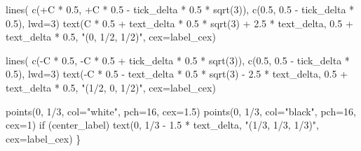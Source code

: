 \documentclass[
  letterpaper,
  DIV=11,
  numbers=noendperiod]{scrartcl}
\newenvironment{Shaded}{\begin{snugshade}}{\end{snugshade}}
\newcommand{\AttributeTok}[1]{\textcolor[rgb]{0.40,0.45,0.13}{#1}}
\newcommand{\ControlFlowTok}[1]{\textcolor[rgb]{0.00,0.23,0.31}{#1}}
\newcommand{\DecValTok}[1]{\textcolor[rgb]{0.68,0.00,0.00}{#1}}
\newcommand{\FloatTok}[1]{\textcolor[rgb]{0.68,0.00,0.00}{#1}}
\newcommand{\FunctionTok}[1]{\textcolor[rgb]{0.28,0.35,0.67}{#1}}
\newcommand{\NormalTok}[1]{\textcolor[rgb]{0.00,0.23,0.31}{#1}}
\newcommand{\SpecialCharTok}[1]{\textcolor[rgb]{0.37,0.37,0.37}{#1}}
\newcommand{\StringTok}[1]{\textcolor[rgb]{0.13,0.47,0.30}{#1}}
\begin{document}
\begin{Shaded}
\begin{Highlighting}[]
  \FunctionTok{lines}\NormalTok{( }\FunctionTok{c}\NormalTok{(}\SpecialCharTok{+}\NormalTok{C }\SpecialCharTok{*} \FloatTok{0.5}\NormalTok{, }\SpecialCharTok{+}\NormalTok{C }\SpecialCharTok{*} \FloatTok{0.5} \SpecialCharTok{{-}}\NormalTok{ tick\_delta }\SpecialCharTok{*} \FloatTok{0.5} \SpecialCharTok{*} \FunctionTok{sqrt}\NormalTok{(}\DecValTok{3}\NormalTok{)),}
         \FunctionTok{c}\NormalTok{(}\FloatTok{0.5}\NormalTok{, }\FloatTok{0.5} \SpecialCharTok{{-}}\NormalTok{ tick\_delta }\SpecialCharTok{*} \FloatTok{0.5}\NormalTok{), }\AttributeTok{lwd=}\DecValTok{3}\NormalTok{)}
  \FunctionTok{text}\NormalTok{(C }\SpecialCharTok{*} \FloatTok{0.5} \SpecialCharTok{+}\NormalTok{ text\_delta }\SpecialCharTok{*} \FloatTok{0.5} \SpecialCharTok{*} \FunctionTok{sqrt}\NormalTok{(}\DecValTok{3}\NormalTok{) }\SpecialCharTok{+} \FloatTok{2.5} \SpecialCharTok{*}\NormalTok{ text\_delta,}
       \FloatTok{0.5} \SpecialCharTok{+}\NormalTok{ text\_delta }\SpecialCharTok{*} \FloatTok{0.5}\NormalTok{, }\StringTok{"(0, 1/2, 1/2)"}\NormalTok{, }\AttributeTok{cex=}\NormalTok{label\_cex)}

  \FunctionTok{lines}\NormalTok{( }\FunctionTok{c}\NormalTok{(}\SpecialCharTok{{-}}\NormalTok{C }\SpecialCharTok{*} \FloatTok{0.5}\NormalTok{, }\SpecialCharTok{{-}}\NormalTok{C }\SpecialCharTok{*} \FloatTok{0.5} \SpecialCharTok{+}\NormalTok{ tick\_delta }\SpecialCharTok{*} \FloatTok{0.5} \SpecialCharTok{*} \FunctionTok{sqrt}\NormalTok{(}\DecValTok{3}\NormalTok{)),}
         \FunctionTok{c}\NormalTok{(}\FloatTok{0.5}\NormalTok{, }\FloatTok{0.5} \SpecialCharTok{{-}}\NormalTok{ tick\_delta }\SpecialCharTok{*} \FloatTok{0.5}\NormalTok{), }\AttributeTok{lwd=}\DecValTok{3}\NormalTok{)}
  \FunctionTok{text}\NormalTok{(}\SpecialCharTok{{-}}\NormalTok{C }\SpecialCharTok{*} \FloatTok{0.5} \SpecialCharTok{{-}}\NormalTok{ text\_delta }\SpecialCharTok{*} \FloatTok{0.5} \SpecialCharTok{*} \FunctionTok{sqrt}\NormalTok{(}\DecValTok{3}\NormalTok{) }\SpecialCharTok{{-}} \FloatTok{2.5} \SpecialCharTok{*}\NormalTok{ text\_delta,}
       \FloatTok{0.5} \SpecialCharTok{+}\NormalTok{ text\_delta }\SpecialCharTok{*} \FloatTok{0.5}\NormalTok{, }\StringTok{"(1/2, 0, 1/2)"}\NormalTok{, }\AttributeTok{cex=}\NormalTok{label\_cex)}

  \FunctionTok{points}\NormalTok{(}\DecValTok{0}\NormalTok{, }\DecValTok{1}\SpecialCharTok{/}\DecValTok{3}\NormalTok{, }\AttributeTok{col=}\StringTok{"white"}\NormalTok{, }\AttributeTok{pch=}\DecValTok{16}\NormalTok{, }\AttributeTok{cex=}\FloatTok{1.5}\NormalTok{)}
  \FunctionTok{points}\NormalTok{(}\DecValTok{0}\NormalTok{, }\DecValTok{1}\SpecialCharTok{/}\DecValTok{3}\NormalTok{, }\AttributeTok{col=}\StringTok{"black"}\NormalTok{, }\AttributeTok{pch=}\DecValTok{16}\NormalTok{, }\AttributeTok{cex=}\DecValTok{1}\NormalTok{)}
  \ControlFlowTok{if}\NormalTok{ (center\_label)}
    \FunctionTok{text}\NormalTok{(}\DecValTok{0}\NormalTok{, }\DecValTok{1}\SpecialCharTok{/}\DecValTok{3} \SpecialCharTok{{-}} \FloatTok{1.5} \SpecialCharTok{*}\NormalTok{ text\_delta, }\StringTok{"(1/3, 1/3, 1/3)"}\NormalTok{, }\AttributeTok{cex=}\NormalTok{label\_cex)}
\NormalTok{\}}
\end{Highlighting}
\end{Shaded}
\end{document}
